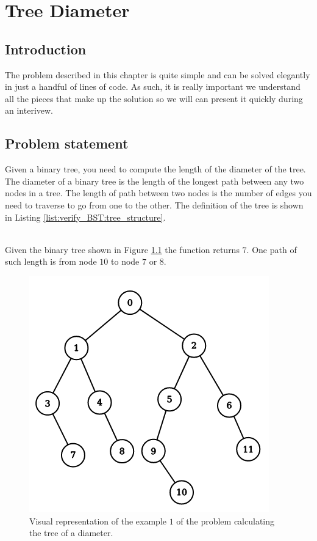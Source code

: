 %

\chapter{Tree Diameter}
\label{ch:tree_diameter}
\section*{Introduction}
The problem described in this chapter is quite simple and can be solved  elegantly in just a handful of lines of code. As such,  it is really important we understand all the pieces that make up the solution  so we will can present it quickly during an interivew.

\section{Problem statement}
\begin{exercise}
 Given a binary tree, you need to compute the length of the diameter of the tree. The diameter of a binary tree is the length of the longest path between any two nodes in a tree. The length of path between two nodes is the number of edges you need to traverse to go from one to the other.
 The definition of the tree is shown in Listing \ref{list:verify_BST:tree_structure}.


	\begin{example}
		\hfill \\
		Given the binary tree shown in Figure \ref{fig:tree_diameter:example1} the function returns $7$. One path of such length is from node $10$ to node $7$ or $8$.
	\end{example}

\end{exercise}

\begin{figure}
	\centering
	\includegraphics[scale=0.6]{sources/tree_diameter/images/example1}
	\caption{Visual representation of the example $1$ of the problem calculating the tree of a diameter.}
	\label{fig:tree_diameter:example1}
\end{figure}


